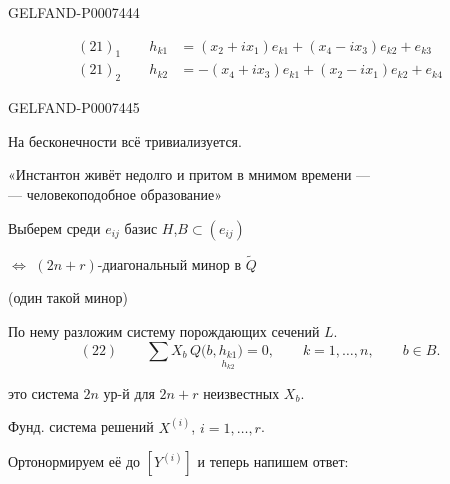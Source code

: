 \begin{GelfandAdjacentEvidence}{GELFAND-P000744}{4}


\begin{align*}
(21)_1\qquad h_{k1}&=(x_2+ix_1)e_{k1}+(x_4-ix_3)e_{k2}+e_{k3}\\
(21)_2\qquad h_{k2}&=-(x_4+ix_3)e_{k1}+(x_2-ix_1)e_{k2}+e_{k4}
\end{align*}

\end{GelfandAdjacentEvidence}
\begin{GelfandAdjacentEvidence}{GELFAND-P000744}{5}


На бесконечности всё тривиализуется.

«Инстантон живёт недолго и притом в мнимом времени ---\\
--- человекоподобное образование»

Выберем среди \(e_{ij}\) базис \(H\),\qquad \(B\subset(e_{ij})\)

\(\Leftrightarrow\) \((2n+r)\)-диагональный минор в \(\widetilde Q\)

(один такой минор)

По нему разложим систему порождающих сечений \(L\).
\[
(22)\qquad \sum X_b\,Q\bigl(b,\underset{h_{k2}}{h_{k1}}\bigr)=0,\qquad
k=1,\ldots,n,\qquad b\in B.
\]
\end{GelfandAdjacentEvidence}


это система \(2n\) ур-й для \(2n+r\) неизвестных \(X_b\).

Фунд. система решений \(X^{(i)}\), \(i=1,\ldots,r\).

Ортонормируем её до \([Y^{(i)}]\) и теперь напишем ответ:


